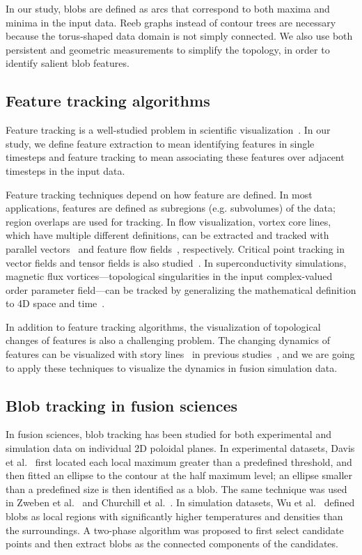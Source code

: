 In our study, blobs are defined as arcs that correspond to both maxima and minima in the input data.  Reeb graphs instead of contour trees are necessary because the torus-shaped data domain is not simply connected.  We also use both persistent and geometric measurements to simplify the topology, in order to identify salient blob features.  


\subsection{Feature tracking algorithms}

Feature tracking is a well-studied problem in scientific visualization~\cite{PostVHLD2003}.  In our study, we define feature extraction to mean identifying features in single timesteps and feature tracking to mean associating these features over adjacent timesteps in the input data.  

Feature tracking techniques depend on how feature are defined.  In most applications, features are defined as subregions (e.g. subvolumes) of the data; region overlaps are used for tracking.  In flow visualization, vortex core lines, which have multiple different definitions, can be extracted and tracked with parallel vectors~\cite{PeikertR99} and feature flow fields~\cite{TheiselS03, WeinkaufTGP11}, respectively.  Critical point tracking in vector fields and tensor fields is also studied~\cite{GarthTS04, TricocheSH01, TricocheWSH02, ReininghausKWH12}.  In superconductivity simulations, magnetic flux vortices---topological singularities in the input complex-valued order parameter field---can be tracked by generalizing the mathematical definition to 4D space and time~\cite{GuoPPKG16, GuoPG17, PhillipsGPKG16, PhillipsPKG15}.  

In addition to feature tracking algorithms, the visualization of topological changes of features is also a challenging problem.  The changing dynamics of features can be visualized with story lines~\cite{TanahashiM12} in previous studies~\cite{GuoPPKG16}, and we are going to apply these techniques to visualize the dynamics in fusion simulation data.  


\subsection{Blob tracking in fusion sciences}

In fusion sciences, blob tracking has been studied for both experimental and simulation data on individual 2D poloidal planes.  In experimental datasets, Davis et al.~\cite{DavisKMRSZ14} first located each local maximum greater than a predefined threshold, and then fitted an ellipse to the contour at the half maximum level; an ellipse smaller than a predefined size is then identified as a blob.  The same technique was used in Zweben et al.~\cite{Zweben15} and Churchill et al.~\cite{Churchill17}.  In simulation datasets, Wu et al.~\cite{WuWSCCSCK16} defined blobs as local regions with significantly higher temperatures and densities than the surroundings.  A two-phase algorithm was proposed to first select candidate points and then extract blobs as the connected components of the candidates.  

